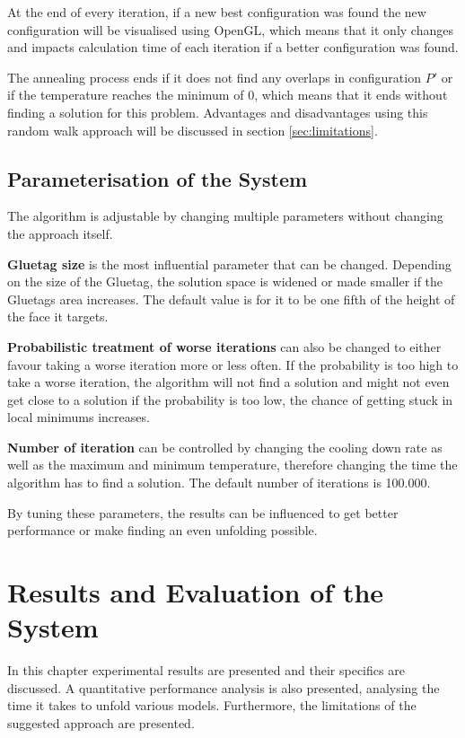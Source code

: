 \documentclass[draft,final]{vutinfth} %
\begin{document}
At the end of every iteration, if a new best configuration was found the new configuration will be visualised using OpenGL, which means that it only changes and impacts calculation time of each iteration if a better configuration was found. 

The annealing process ends if it does not find any overlaps in configuration $P'$ or if the temperature reaches the minimum of $0$, which means that it ends without finding a solution for this problem. Advantages and disadvantages using this random walk approach will be discussed in section \ref{sec:limitations}.

\section{Parameterisation of the System}
The algorithm is adjustable by changing multiple parameters without changing the approach itself.

\textbf{Gluetag size} is the most influential parameter that can be changed. Depending on the size of the Gluetag, the solution space is widened or made smaller if the Gluetags area increases. The default value is for it to be one fifth of the height of the face it targets.

\textbf{Probabilistic treatment of worse iterations} can also be changed to either favour taking a worse iteration more or less often. If the probability is too high to take a worse iteration, the algorithm will not find a solution and might not even get close to a solution if the probability is too low, the chance of getting stuck in local minimums increases.

\textbf{Number of iteration} can be controlled by changing the cooling down rate as well as the maximum and minimum temperature, therefore changing the time the algorithm has to find a solution. The default number of iterations is 100.000.

By tuning these parameters, the results can be influenced to get better performance or make finding an even unfolding possible.

\chapter{Results and Evaluation of the System}
\label{chap:reseval}
In this chapter experimental results are presented and their specifics are discussed. A quantitative performance analysis is also presented, analysing the time it takes to unfold various models. Furthermore, the limitations of the suggested approach are presented.
\end{document}
